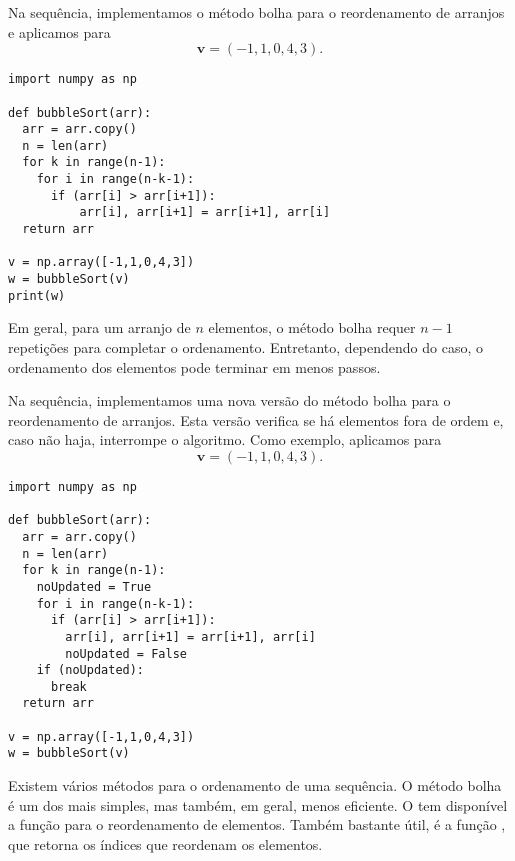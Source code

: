 \begin{ex}
  Na sequência, implementamos o método bolha para o reordenamento de arranjos e aplicamos para
  \begin{equation}
    \pmb{v} = (-1, 1, 0, 4, 3).
  \end{equation}
  
\begin{lstlisting}[caption=bubbleSort\_v1.py]
import numpy as np

def bubbleSort(arr):
  arr = arr.copy()
  n = len(arr)
  for k in range(n-1):
    for i in range(n-k-1):
      if (arr[i] > arr[i+1]):
          arr[i], arr[i+1] = arr[i+1], arr[i]
  return arr

v = np.array([-1,1,0,4,3])
w = bubbleSort(v)
print(w)
\end{lstlisting}

\end{ex}

\begin{obs}
  Em geral, para um arranjo de $n$ elementos, o método bolha requer $n-1$ repetições para completar o ordenamento. Entretanto, dependendo do caso, o ordenamento dos elementos pode terminar em menos passos.
\end{obs}

\begin{ex}
  Na sequência, implementamos uma nova versão do método bolha para o reordenamento de arranjos. Esta versão verifica se há elementos fora de ordem e, caso não haja, interrompe o algoritmo. Como exemplo, aplicamos para
  \begin{equation}
    \pmb{v} = (-1, 1, 0, 4, 3).
  \end{equation}
  
\begin{lstlisting}[caption=bubbleSort\_v2.py]
import numpy as np

def bubbleSort(arr):
  arr = arr.copy()
  n = len(arr)
  for k in range(n-1):
    noUpdated = True
    for i in range(n-k-1):
      if (arr[i] > arr[i+1]):
        arr[i], arr[i+1] = arr[i+1], arr[i]
        noUpdated = False
    if (noUpdated):
      break
  return arr

v = np.array([-1,1,0,4,3])
w = bubbleSort(v)
\end{lstlisting}

\end{ex}

\begin{obs}
  Existem vários métodos para o ordenamento de uma sequência. O método bolha é um dos mais simples, mas também, em geral, menos eficiente. O {\numpy} tem disponível a função {\PYTHONnumpyDOTsort} para o reordenamento de elementos. Também bastante útil, é a função {\PYTHONnumpyDOTargsort}, que retorna os índices que reordenam os elementos.
\end{obs}

